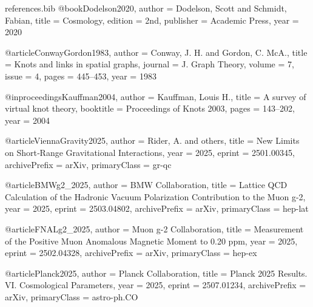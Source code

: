 \begin{filecontents}{references.bib}
@book{Dodelson2020,
  author    = {Dodelson, Scott and Schmidt, Fabian},
  title     = {Cosmology},
  edition   = {2nd},
  publisher = {Academic Press},
  year      = {2020}
}

@article{ConwayGordon1983,
  author  = {Conway, J. H. and Gordon, C. McA.},
  title   = {{Knots and links in spatial graphs}},
  journal = {J. Graph Theory},
  volume  = {7},
  issue   = {4},
  pages   = {445--453},
  year    = {1983}
}

@inproceedings{Kauffman2004,
  author    = {Kauffman, Louis H.},
  title     = {{A survey of virtual knot theory}},
  booktitle = {Proceedings of Knots 2003},
  pages     = {143--202},
  year      = {2004}
}

@article{ViennaGravity2025,
  author  = {Rider, A. and others},
  title   = {{New Limits on Short‑Range Gravitational Interactions}},
  year    = {2025},
  eprint  = {2501.00345},
  archivePrefix = {arXiv},
  primaryClass = {gr-qc}
}

@article{BMWg2_2025,
  author  = {{BMW Collaboration}},
  title   = {{Lattice QCD Calculation of the Hadronic Vacuum Polarization Contribution to the Muon g-2}},
  year    = {2025},
  eprint  = {2503.04802},
  archivePrefix = {arXiv},
  primaryClass = {hep-lat}
}

@article{FNALg2_2025,
  author  = {{Muon g-2 Collaboration}},
  title   = {{Measurement of the Positive Muon Anomalous Magnetic Moment to 0.20 ppm}},
  year    = {2025},
  eprint  = {2502.04328},
  archivePrefix = {arXiv},
  primaryClass = {hep-ex}
}

@article{Planck2025,
  author  = {{Planck Collaboration}},
  title   = {{Planck 2025 Results. VI. Cosmological Parameters}},
  year    = {2025},
  eprint  = {2507.01234},
  archivePrefix = {arXiv},
  primaryClass = {astro-ph.CO}
}

\end{filecontents}
\documentclass[11pt,letterpaper]{article}
\usepackage{times}
\usepackage{helvet}
\usepackage{courier}
\usepackage[margin=1in]{geometry}
\usepackage{amsmath,amssymb,amsthm}
\usepackage{tikz}
\usepackage{graphicx}
\usepackage{subcaption}
\usepackage{booktabs}
\usepackage{listings}
\usepackage{hyperref}  %

